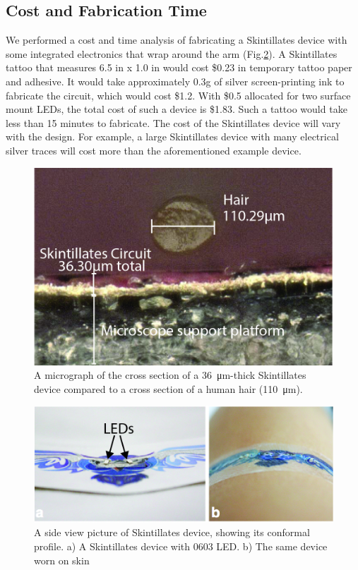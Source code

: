 \documentclass{sigchi}
\begin{document}
\subsection{Cost and Fabrication Time}
We performed a cost and time analysis of fabricating a Skintillates device with some integrated electronics that wrap around the arm (Fig.\ref{fig:LED0603}). A Skintillates tattoo that measures 6.5 in x 1.0 in would cost \$0.23 in temporary tattoo paper and adhesive. It would take approximately 0.3g of silver screen-printing ink to fabricate the circuit, which would cost \$1.2. With \$0.5 allocated for two surface mount LEDs, the total cost of such a device is \$1.83. Such a tattoo would take less than 15 minutes to fabricate. The cost of the Skintillates device will vary with the design. For example, a large Skintillates device with many electrical silver traces will cost more than the aforementioned example device.  

\begin{figure}[!ht]
\centering
\includegraphics[width=1\columnwidth]{figures/Figure2}
\caption{A micrograph of the cross section of a \SI{36}{\micro\metre}-thick Skintillates device compared to a cross section of a human hair (\SI{110}{\micro\metre}).}
\vspace{-8pt}
\label{fig:micrograph}
\end{figure}

\begin{figure}
\centering
\includegraphics[width=1\columnwidth]{figures/LED0603}
\caption{A side view picture of Skintillates device, showing its conformal profile. a) A Skintillates device with 0603 LED. b) The same device worn on skin}
\vspace{-8pt}
\label{fig:LED0603}
\end{figure}
\end{document}
